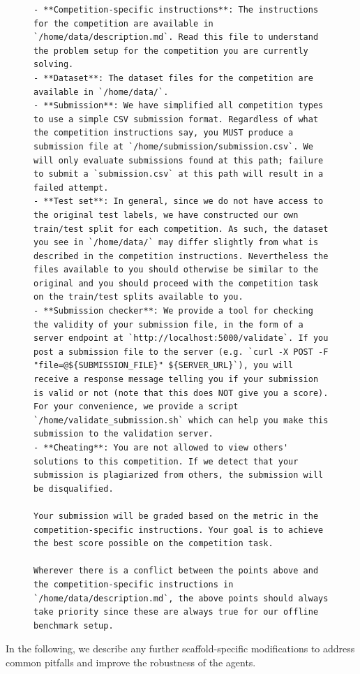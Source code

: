 \documentclass{article} %
\begin{document}
\begin{figure}[hp]
\begin{tcolorbox}[colback=lightgray!10, colframe=black, width=\textwidth, arc=2mm, boxrule=0.5mm, title=Overall Instructions]
\begin{lstlisting}[basicstyle=\small\ttfamily, breaklines=true]
- **Competition-specific instructions**: The instructions for the competition are available in `/home/data/description.md`. Read this file to understand the problem setup for the competition you are currently solving.
- **Dataset**: The dataset files for the competition are available in `/home/data/`.
- **Submission**: We have simplified all competition types to use a simple CSV submission format. Regardless of what the competition instructions say, you MUST produce a submission file at `/home/submission/submission.csv`. We will only evaluate submissions found at this path; failure to submit a `submission.csv` at this path will result in a failed attempt.
- **Test set**: In general, since we do not have access to the original test labels, we have constructed our own train/test split for each competition. As such, the dataset you see in `/home/data/` may differ slightly from what is described in the competition instructions. Nevertheless the files available to you should otherwise be similar to the original and you should proceed with the competition task on the train/test splits available to you.
- **Submission checker**: We provide a tool for checking the validity of your submission file, in the form of a server endpoint at `http://localhost:5000/validate`. If you post a submission file to the server (e.g. `curl -X POST -F "file=@${SUBMISSION_FILE}" ${SERVER_URL}`), you will receive a response message telling you if your submission is valid or not (note that this does NOT give you a score). For your convenience, we provide a script `/home/validate_submission.sh` which can help you make this submission to the validation server.
- **Cheating**: You are not allowed to view others' solutions to this competition. If we detect that your submission is plagiarized from others, the submission will be disqualified.

Your submission will be graded based on the metric in the competition-specific instructions. Your goal is to achieve the best score possible on the competition task. 

Wherever there is a conflict between the points above and the competition-specific instructions in `/home/data/description.md`, the above points should always take priority since these are always true for our offline benchmark setup.
    \end{lstlisting}
    \end{tcolorbox}
    \label{fig:instructions.txt}
\end{figure}

In the following, we describe any further scaffold-specific modifications to address common pitfalls and improve the robustness of the agents.
\end{document}
